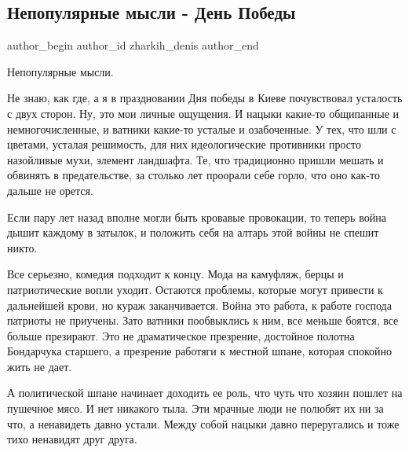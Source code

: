  
 
 
 
 
 
\subsection{Непопулярные мысли - День Победы}
\label{sec:09_05_2021.fb.zharkih_denis.1.den_pobedy}
 
\ifcmt
 author_begin
   author_id zharkih_denis
 author_end
\fi

Непопулярные мысли. 

Не знаю, как где, а я в праздновании Дня победы в Киеве почувствовал усталость
с двух сторон. Ну, это мои личные ощущения. И нацыки какие-то общипанные и
немногочисленные, и ватники какие-то усталые и озабоченные.  У тех, что шли с
цветами, усталая решимость, для них идеологические противники просто назойливые
мухи, элемент ландшафта. Те, что традиционно пришли мешать и обвинять в
предательстве, за столько лет проорали себе горло, что оно как-то дальше не
орется.  

Если пару лет назад вполне могли быть кровавые провокации, то теперь война
дышит каждому в затылок, и положить себя на алтарь этой войны не спешит никто.

Все серьезно, комедия подходит к концу. Мода на камуфляж, берцы и
патриотические вопли уходит. Остаются проблемы, которые могут привести к
дальнейшей крови, но кураж заканчивается. Война это работа, к работе господа
патриоты не приучены. Зато ватники пообвыклись к ним, все меньше боятся, все
больше презирают. Это не драматическое презрение, достойное полотна Бондарчука
старшего, а презрение работяги к местной шпане, которая спокойно жить не дает.

А политической шпане начинает доходить ее роль, что чуть что хозяин пошлет на
пушечное мясо. И нет никакого тыла. Эти мрачные люди не полюбят их ни за что, а
ненавидеть давно устали. Между собой нацыки давно переругались и тоже тихо
ненавидят друг друга. 

